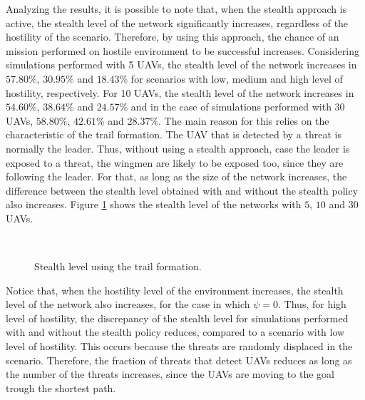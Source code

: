 Analyzing the results, it is possible to note that, when the stealth approach is active, the stealth level of the network significantly increases, regardless of the hostility of the scenario. Therefore, by using this approach, the chance of an mission performed on hostile environment to be successful increases. Considering simulations performed with 5 UAVs, the stealth level of the network increases in $57.80\%$, $30.95\%$ and $18.43\%$ for scenarios with low, medium and high level of hostility, respectively. For 10 UAVs, the stealth level of the network increases in $54.60\%$, $38.64\%$ and $24.57\%$ and in the case of simulations performed with 30 UAVs, $58.80\%$, $42.61\%$ and $28.37\%$. The main reason for this relies on the characteristic of the trail formation. The UAV that is detected by a threat is normally the leader. Thus, without using a stealth approach, case the leader is exposed to a threat, the wingmen are likely to be exposed too, since they are following the leader. For that, as long as the size of the network increases, the difference between the stealth level obtained with and without the stealth policy also increases. Figure \ref{fig:Trail_stealthLevel} shows the stealth level of the networks with $5$, $10$ and $30$ UAVs.

\begin{figure}[hbt!]
      \centering            
         \\ \centering
      \caption{Stealth level using the trail formation.}
      \label{fig:Trail_stealthLevel}
\end{figure}

Notice that, when the hostility level of the environment increases, the stealth level of the network also increases, for the case in which $\psi=0$. Thus, for high level of hostility, the discrepancy of the stealth level for simulations performed with and without the stealth policy reduces, compared to a scenario with low level of hostility. This occurs because the threats are randomly displaced in the scenario. Therefore, the fraction of threats that detect UAVs reduces as long as the number of the threats increases, since the UAVs are moving to the goal trough the shortest path.

